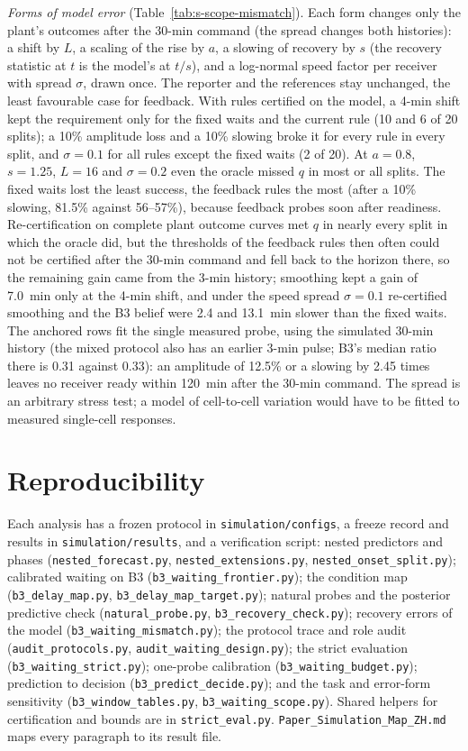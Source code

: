 \documentclass[conference]{IEEEtran}
\begin{document}
\emph{Forms of model error} (Table~\ref{tab:s-scope-mismatch}). Each form changes only the plant's outcomes after the 30-min command (the spread changes both histories): a shift by $L$, a scaling of the rise by $a$, a slowing of recovery by $s$ (the recovery statistic at $t$ is the model's at $t/s$), and a log-normal speed factor per receiver with spread $\sigma$, drawn once. The reporter and the references stay unchanged, the least favourable case for feedback. With rules certified on the model, a 4-min shift kept the requirement only for the fixed waits and the current rule (10 and 6 of 20 splits); a 10\% amplitude loss and a 10\% slowing broke it for every rule in every split, and $\sigma=0.1$ for all rules except the fixed waits (2 of 20). At $a=0.8$, $s=1.25$, $L=16$ and $\sigma=0.2$ even the oracle missed $q$ in most or all splits. The fixed waits lost the least success, the feedback rules the most (after a 10\% slowing, 81.5\% against 56--57\%), because feedback probes soon after readiness. Re-certification on complete plant outcome curves met $q$ in nearly every split in which the oracle did, but the thresholds of the feedback rules then often could not be certified after the 30-min command and fell back to the horizon there, so the remaining gain came from the 3-min history; smoothing kept a gain of 7.0~min only at the 4-min shift, and under the speed spread $\sigma=0.1$ re-certified smoothing and the B3 belief were 2.4 and 13.1~min slower than the fixed waits. The anchored rows fit the single measured probe, using the simulated 30-min history (the mixed protocol also has an earlier 3-min pulse; B3's median ratio there is 0.31 against 0.33): an amplitude of 12.5\% or a slowing by 2.45 times leaves no receiver ready within 120~min after the 30-min command. The spread is an arbitrary stress test; a model of cell-to-cell variation would have to be fitted to measured single-cell responses.

\section{Reproducibility}
\label{sec:s-repro}
\sloppy
Each analysis has a frozen protocol in \texttt{simulation/configs}, a freeze record and results in \texttt{simulation/results}, and a verification script: nested predictors and phases (\texttt{nested\_forecast.py}, \texttt{nested\_extensions.py}, \texttt{nested\_onset\_split.py}); calibrated waiting on B3 (\texttt{b3\_waiting\_frontier.py}); the condition map (\texttt{b3\_delay\_map.py}, \texttt{b3\_delay\_map\_target.py}); natural probes and the posterior predictive check (\texttt{natural\_probe.py}, \texttt{b3\_recovery\_check.py}); recovery errors of the model (\texttt{b3\_waiting\_mismatch.py}); the protocol trace and role audit (\texttt{audit\_protocols.py}, \texttt{audit\_waiting\_design.py}); the strict evaluation (\texttt{b3\_waiting\_strict.py}); one-probe calibration (\texttt{b3\_waiting\_budget.py}); prediction to decision (\texttt{b3\_predict\_decide.py}); and the task and error-form sensitivity (\texttt{b3\_window\_tables.py}, \texttt{b3\_waiting\_scope.py}). Shared helpers for certification and bounds are in \texttt{strict\_eval.py}. \texttt{Paper\_Simulation\_Map\_ZH.md} maps every paragraph to its result file.



\end{document}
